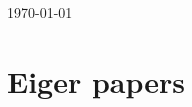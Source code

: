 \documentclass{article}
\begin{document}
\today
\section*{Eiger papers}
\nocite{*}
\renewcommand{\section}[2]{}%
{}

\end{document}
